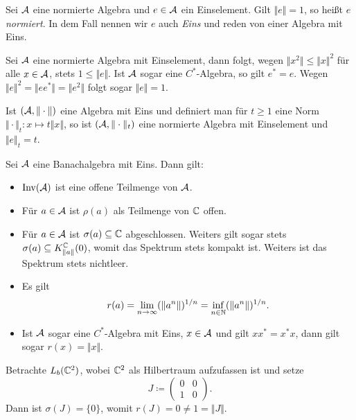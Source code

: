 \begin{definition}
    Sei $\mathcal{A}$ eine normierte Algebra und $e \in \mathcal{A}$ ein Einselement. Gilt $\Vert e \Vert = 1$, so heißt $e$ \emph{normiert}. In dem Fall nennen wir $e$ auch \emph{Eins} und reden von einer Algebra mit Eins.
\end{definition}

\begin{remark}
    Sei $\mathcal{A}$ eine normierte Algebra mit Einselement, dann folgt, wegen $\Vert x^2 \Vert \leq \Vert x \Vert^2$ für alle $x \in \mathcal{A}$, stets $1 \leq \Vert e \Vert$. Ist $\mathcal{A}$ sogar eine $C^*$-Algebra, so gilt $e^* = e$. Wegen $\Vert e \Vert^2 = \Vert e e^* \Vert = \Vert e^2 \Vert$ folgt sogar $\Vert e \Vert = 1$.
\end{remark}

\begin{example}
    Ist $(\mathcal{A}, \Vert \cdot \Vert)$ eine Algebra mit Eins und definiert man für $t \geq 1$ eine Norm $\Vert \cdot \Vert_t : x \mapsto t \Vert x \Vert$, so ist $(\mathcal{A}, \Vert \cdot \Vert_t)$ eine normierte Algebra mit Einselement und $\Vert e \Vert_t = t$.
\end{example}

\begin{remark}
    Sei $\mathcal{A}$ eine Banachalgebra mit Eins. Dann gilt:
    \begin{itemize}
        \item $\operatorname*{Inv}(\mathcal{A})$ ist eine offene Teilmenge von $\mathcal{A}$.
        \item Für $a \in \mathcal{A}$ ist $\rho(a)$ als Teilmenge von $\mathbb{C}$ offen.
        \item Für $a \in \mathcal{A}$ ist $\sigma(a) \subseteq \mathbb{C}$ abgeschlossen. Weiters gilt sogar stets $\sigma(a) \subseteq K^{\mathbb{C}}_{\Vert a \Vert}(0)$, womit das Spektrum stets kompakt ist. Weiters ist das Spektrum stets nichtleer.
        \item Es gilt
        $$ r(a) = \lim_{n \to \infty} (\Vert a^n \Vert)^{1/n} = \inf_{n \in \mathbb{N}} (\Vert a^n \Vert)^{1/n}. $$
        \item Ist $\mathcal{A}$ sogar eine $C^*$-Algebra mit Eins, $x \in \mathcal{A}$ und gilt $x x^* = x^* x$, dann gilt sogar $r(x) = \Vert x \Vert$.
    \end{itemize}
\end{remark}

\begin{example}
    Betrachte $L_b(\mathbb{C}^2)$, wobei $\mathbb{C}^2$ als Hilbertraum aufzufassen ist und setze
    $$ J \coloneqq \begin{pmatrix}
        0 & 0 \\ 1 & 0
    \end{pmatrix}. $$
    Dann ist $\sigma(J) = \{ 0 \}$, womit $r(J) = 0 \neq 1 = \Vert J \Vert$.
\end{example}

